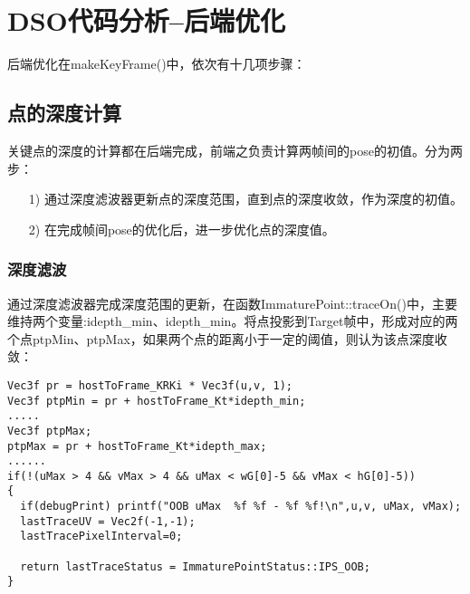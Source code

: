 
\chapter{DSO代码分析--后端优化}
后端优化在makeKeyFrame()中，依次有十几项步骤：



\section{点的深度计算}
关键点的深度的计算都在后端完成，前端之负责计算两帧间的pose的初值。分为两步：
\begin{itemize}
	\item [1)] 通过深度滤波器更新点的深度范围，直到点的深度收敛，作为深度的初值。
	\item [2)] 在完成帧间pose的优化后，进一步优化点的深度值。
\end{itemize} 


\subsection{深度滤波}
通过深度滤波器完成深度范围的更新，在函数ImmaturePoint::traceOn()中，主要维持两个变量:idepth\_min、idepth\_min。将点投影到Target帧中，形成对应的两个点ptpMin、ptpMax，如果两个点的距离小于一定的阈值，则认为该点深度收敛：
\begin{lstlisting}[caption={  ImmaturePoint::traceOn()}]  
Vec3f pr = hostToFrame_KRKi * Vec3f(u,v, 1);
Vec3f ptpMin = pr + hostToFrame_Kt*idepth_min;		
.....
Vec3f ptpMax;
ptpMax = pr + hostToFrame_Kt*idepth_max;
......
if(!(uMax > 4 && vMax > 4 && uMax < wG[0]-5 && vMax < hG[0]-5))
{
  if(debugPrint) printf("OOB uMax  %f %f - %f %f!\n",u,v, uMax, vMax);
  lastTraceUV = Vec2f(-1,-1);
  lastTracePixelInterval=0;
  
  return lastTraceStatus = ImmaturePointStatus::IPS_OOB;
}
\end{lstlisting}  

